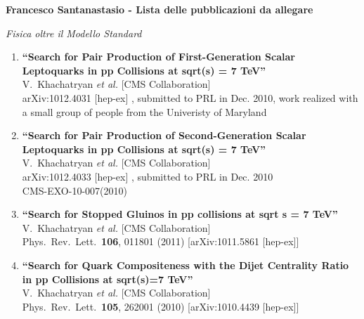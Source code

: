 \documentclass[10pt]{letter}
\begin{document}
{\large \sc \bf Francesco Santanastasio - Lista delle pubblicazioni da allegare}



\begin{center} \textit{Fisica oltre il Modello Standard} \end{center}

\begin{enumerate}

\item%
{\bf ``Search for Pair Production of First-Generation Scalar Leptoquarks in pp Collisions at sqrt(s) = 7 TeV''}
  \\{}V.~Khachatryan {\it et al.}  [CMS Collaboration]
  \\{}arXiv:1012.4031 [hep-ex] , submitted to PRL in Dec. 2010, work realized with a small group of people from the Univeristy of Maryland

\item%
{\bf ``Search for Pair Production of Second-Generation Scalar Leptoquarks in pp Collisions at sqrt(s) = 7 TeV''}
  \\{}V.~Khachatryan {\it et al.}  [CMS Collaboration]
  \\{}arXiv:1012.4033 [hep-ex] , submitted to PRL in Dec. 2010
\\{}CMS-EXO-10-007(2010)

\item%
{\bf ``Search for Stopped Gluinos in pp collisions at sqrt s = 7 TeV''}
  \\{}V.~Khachatryan {\it et al.}  [CMS Collaboration]
  \\{}Phys.\ Rev.\ Lett.\  {\bf 106}, 011801 (2011)
  [arXiv:1011.5861 [hep-ex]]

\item%
{\bf ``Search for Quark Compositeness with the Dijet Centrality Ratio in pp Collisions at sqrt(s)=7 TeV''}
  \\{}V.~Khachatryan {\it et al.}  [CMS Collaboration]
  \\{}Phys.\ Rev.\ Lett.\  {\bf 105}, 262001 (2010)
  [arXiv:1010.4439 [hep-ex]]


\end{enumerate}
\end{document}
